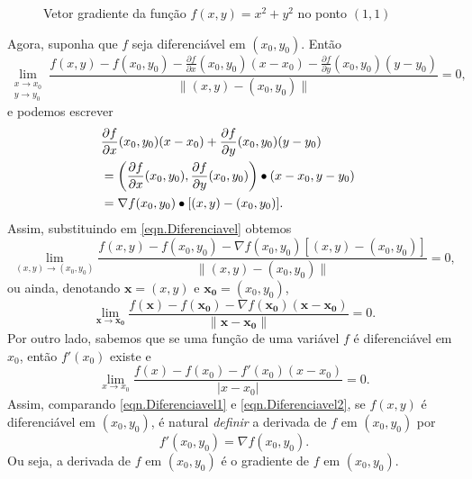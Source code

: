 \begin{example}
\begin{figure}[htbp]
        \caption{Vetor gradiente da função \(f(x,y)=x^2+y^2\) no ponto \((1,1)\)}
        \label{fig:VetorGradiente}
    \end{figure}
\end{example}

Agora, suponha que \(f\) seja diferenciável em \((x_0,y_0)\). Então
    \begin{equation}\label{eqn.Diferenciavel}
        \lim_{\substack{x\to x_0 \\ y\to y_0}} \frac{f(x,y) - f(x_0,y_0) - \frac{\partial f}{\partial x}(x_0,y_0)(x-x_0) - \frac{\partial f}{\partial y}(x_0,y_0)(y-y_0)}{\|(x,y)-(x_0,y_0)\|} = 0,
    \end{equation}
e podemos escrever
    \begin{align*}
        {\lefteqn{\frac{\partial f}{\partial x}(x_0,y_0)(x-x_0) + \frac{\partial f}{\partial y}(x_0,y_0)(y-y_0)}} \\
            & = \left( \frac{\partial f}{\partial x}(x_0,y_0),\frac{\partial f}{\partial y}(x_0,y_0) \right)\bullet (x-x_0,y-y_0) \\ 
            & = \nabla f(x_0,y_0)\bullet[(x,y)-(x_0,y_0)].
    \end{align*}
Assim, substituindo em \eqref{eqn.Diferenciavel} obtemos \[\lim_{(x,y)\to(x_0,y_0)} \frac{f(x,y) - f(x_0,y_0) - \nabla f(x_0,y_0)[(x,y) - (x_0,y_0)]}{\|(x,y) - (x_0,y_0)\|} = 0,\] ou ainda, denotando \(\mathbf{x} = (x,y)\) e \(\mathbf{x_0}=(x_0,y_0)\),
    \begin{equation}\label{eqn.Diferenciavel1}
        \lim_{\mathbf{x}\to\mathbf{x_0}} \frac{f(\mathbf{x}) - f(\mathbf{x_0}) - \nabla f(\mathbf{x_0})(\mathbf{x} - \mathbf{x_0})}{\|\mathbf{x} - \mathbf{x_0}\|} = 0.
    \end{equation}
Por outro lado, sabemos que se uma função de uma variável \(f\) é diferenciável em \(x_0\), então \(f'(x_0)\) existe e
    \begin{equation}\label{eqn.Diferenciavel2}
        \lim_{x\to x_0} \frac{f(x) - f(x_0) - f'(x_0)(x-x_0)}{|x-x_0|} = 0.
    \end{equation}
Assim, comparando \eqref{eqn.Diferenciavel1} e \eqref{eqn.Diferenciavel2}, se \(f(x,y)\) é diferenciável em \((x_0,y_0)\), é natural \textit{definir} a derivada de \(f\) em \((x_0,y_0)\) por \[f'(x_0,y_0) = \nabla f(x_0,y_0).\] Ou seja, a derivada de \(f\) em \((x_0,y_0)\) é o gradiente de \(f\) em \((x_0,y_0)\).

